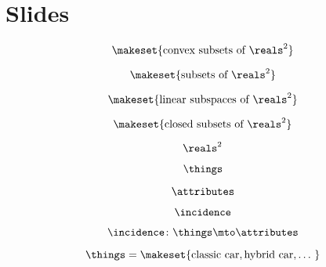 
\section{Slides}

\begin{forslides}

    \begin{equation}
        \label{eq:slides_adjunctions_1}
      \makeset{\text{convex subsets of } \reals^2}
    \end{equation}
    
     \begin{equation}
        \label{eq:slides_adjunctions_2}
       \makeset{\text{subsets of } \reals^2}
    \end{equation}
    
     \begin{equation}
        \label{eq:slides_adjunctions_3}
      \makeset{\text{linear subspaces of } \reals^2}
    \end{equation}
    
     \begin{equation}
        \label{eq:slides_adjunctions_4}
       \makeset{\text{closed subsets of } \reals^2}
    \end{equation}
    
     \begin{equation}
        \label{eq:slides_adjunctions_5}
     \reals^2
    \end{equation}
    
     \begin{equation}
        \label{eq:slides_adjunctions_6}
       \things
    \end{equation}
    
     \begin{equation}
        \label{eq:slides_adjunctions_7}
       \attributes
    \end{equation}
    
     \begin{equation}
        \label{eq:slides_adjunctions_8}
       \incidence
    \end{equation}
    
     \begin{equation}
        \label{eq:slides_adjunctions_9}
        \incidence \colon \things \mto \attributes
    \end{equation}
    
     \begin{equation}
        \label{eq:slides_adjunctions_10}
       \things = \makeset{\text{classic car} ,\text{hybrid car}, \dots \ }
    \end{equation}
    

\end{forslides}
